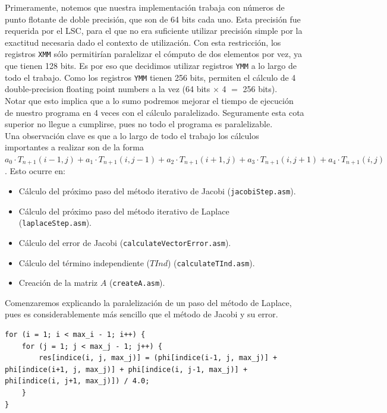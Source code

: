 \documentclass[a4paper]{article}
\begin{document}
Primeramente, notemos que nuestra implementación trabaja con números de punto flotante de doble
precisión, que son de 64 bits cada uno. Esta precisión fue requerida por el LSC, para el que no
era suficiente utilizar precisión simple por la exactitud necesaria dado el contexto de utilización.
Con esta restricción, los registros \texttt{XMM} sólo permitirían paralelizar el cómputo de dos elementos por vez,
ya que tienen 128 bits. Es por eso que decidimos utilizar registros \texttt{YMM} a lo largo de todo el trabajo.
Como los registros \texttt{YMM} tienen 256 bits, permiten el cálculo de 4 double-precision floating point numbers
a la vez (64 bits $\times$ 4 $=$ 256 bits).\\
Notar que esto implica que a lo sumo podremos mejorar el tiempo de ejecución de nuestro programa en 4 veces
con el cálculo paralelizado. Seguramente esta cota superior no llegue a cumplirse, pues no todo el programa
es paralelizable.\\

Una observación clave es que a lo largo de todo el trabajo los cálculos importantes a realizar son de la
forma $a_0 \cdot T_{n+1}(i-1,j) + a_1 \cdot T_{n+1}(i,j-1) + a_2 \cdot T_{n+1}(i+1,j) + a_3 \cdot T_{n+1}(i,j+1) + a_4 \cdot T_{n+1}(i,j)$. Esto ocurre en:

\begin{itemize}
\item Cálculo del próximo paso del método iterativo de Jacobi (\texttt{jacobiStep.asm}).
\item Cálculo del próximo paso del método iterativo de Laplace (\texttt{laplaceStep.asm}).
\item Cálculo del error de Jacobi (\texttt{calculateVectorError.asm}).
\item Cálculo del término independiente ($TInd$) (\texttt{calculateTInd.asm}).
\item Creación de la matriz $A$ (\texttt{createA.asm}).
\end{itemize}

Comenzaremos explicando la paralelización de un paso del método de 
Laplace, pues es considerablemente más sencillo que el método de Jacobi y su error.

\begin{lstlisting}[caption = {Porción de la versión en C del código que calcula un paso del Laplace}]
for (i = 1; i < max_i - 1; i++) {
	for (j = 1; j < max_j - 1; j++) {
		res[indice(i, j, max_j)] = (phi[indice(i-1, j, max_j)] + phi[indice(i+1, j, max_j)] + phi[indice(i, j-1, max_j)] + phi[indice(i, j+1, max_j)]) / 4.0;
	}
}
\end{lstlisting}
\end{document}
